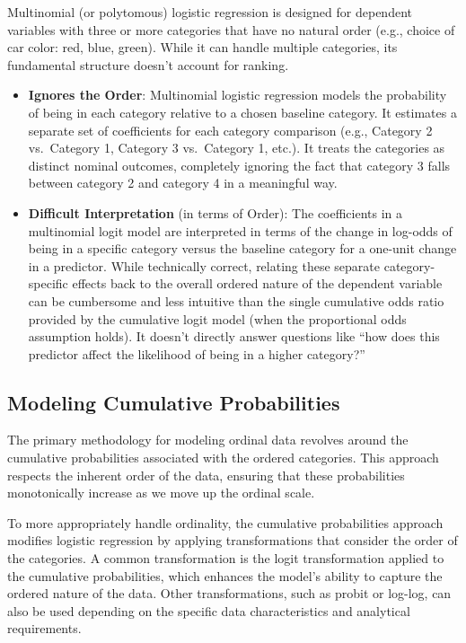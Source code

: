 \documentclass[
  letterpaper,
  DIV=11,
  numbers=noendperiod]{scrartcl}
\begin{document}
Multinomial (or polytomous) logistic regression is designed for
dependent variables with three or more categories that have no natural
order (e.g., choice of car color: red, blue, green). While it can handle
multiple categories, its fundamental structure doesn't account for
ranking.

\begin{itemize}
\item
  \textbf{Ignores the Order}: Multinomial logistic regression models the
  probability of being in each category relative to a chosen baseline
  category. It estimates a separate set of coefficients for each
  category comparison (e.g., Category 2 vs.~Category 1, Category 3
  vs.~Category 1, etc.). It treats the categories as distinct nominal
  outcomes, completely ignoring the fact that category 3 falls between
  category 2 and category 4 in a meaningful way.
\item
  \textbf{Difficult Interpretation} (in terms of Order): The
  coefficients in a multinomial logit model are interpreted in terms of
  the change in log-odds of being in a specific category versus the
  baseline category for a one-unit change in a predictor. While
  technically correct, relating these separate category-specific effects
  back to the overall ordered nature of the dependent variable can be
  cumbersome and less intuitive than the single cumulative odds ratio
  provided by the cumulative logit model (when the proportional odds
  assumption holds). It doesn't directly answer questions like ``how
  does this predictor affect the likelihood of being in a higher
  category?''
\end{itemize}

\hypertarget{modeling-cumulative-probabilities}{%
\subsection{Modeling Cumulative
Probabilities}\label{modeling-cumulative-probabilities}}

The primary methodology for modeling ordinal data revolves around the
cumulative probabilities associated with the ordered categories. This
approach respects the inherent order of the data, ensuring that these
probabilities monotonically increase as we move up the ordinal scale.

To more appropriately handle ordinality, the cumulative probabilities
approach modifies logistic regression by applying transformations that
consider the order of the categories. A common transformation is the
logit transformation applied to the cumulative probabilities, which
enhances the model's ability to capture the ordered nature of the data.
Other transformations, such as probit or log-log, can also be used
depending on the specific data characteristics and analytical
requirements.
\end{document}
